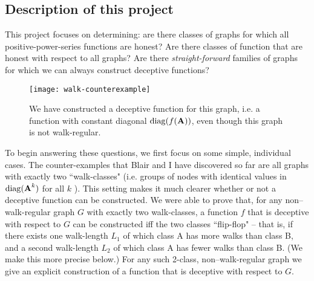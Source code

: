 \subsection{Description of this project}
This project focuses on determining: are there classes of graphs for which all positive-power-series functions are honest? Are there classes of function that are honest with respect to all graphs? Are there \emph{straight-forward} families of graphs for which we can always construct deceptive functions?

\begin{figure}[ht]
\centering
\texttt{[image: walk-counterexample]}%
\caption{We have constructed a deceptive function for this graph, i.e. a function with constant diagonal $\operatorname{diag}(f(\textbf{A}))$, even though this graph is not walk-regular.}
\label{fig:counterexample-dreidel}
\end{figure}

To begin answering these questions, we first focus on some simple, individual cases. The counter-examples that Blair and I have discovered so far are all graphs with exactly two ``walk-classes" (i.e. groups of nodes with identical values in $\operatorname{diag}(\textbf{A}^k)$ for all $k$ ).
This setting makes it much clearer whether or not a deceptive function can be constructed.
We were able to prove that, for any non--walk-regular graph $G$ with exactly two walk-classes, a function $f$ that is deceptive with respect to $G$ can be constructed iff the two classes ``flip-flop" -- that is, if there exists one walk-length $L_1$ of which class A has more walks than class B, and a second walk-length $L_2$ of which class A has fewer walks than class B. (We make this more precise below.) For any such 2-class, non--walk-regular graph we give an explicit construction of a function that is deceptive with respect to $G$.

